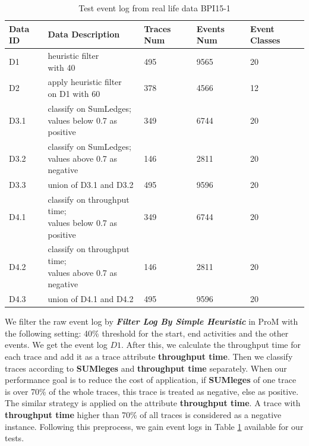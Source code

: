 \begin{table}[h]	
	\caption{Test event log from real life data BPI15-1}
	\label{tab:event-log}
	\begin{tabular}{|l|l|l|l|l|}
		\hline
		Data ID & Data Description                                & Traces Num & Events Num & Event Classes \\ \hline
		D1      & \makecell{heuristic filter  \\ with 40 }                     & 495        & 9565       & 20             \\ \hline
		D2      & \makecell{apply heuristic filter \\ on D1 with 60      }     & 378        & 4566       & 12            \\ \hline
		D3.1    & \makecell{classify on SumLedges;  \\ values below 0.7 as positive} & 349        & 6744       & 20             \\ \hline
		D3.2    & \makecell{classify on SumLedges;  \\ values above 0.7 as negative }& 146        & 2811       & 20             \\  \hline
		D3.3    & union of D3.1 and D3.2                             & 495        & 9596       & 20             \\ \hline
		D4.1    & \makecell{ classify on throughput time;  \\ values below 0.7 as positive} & 349        & 6744       & 20             \\ \hline
		D4.2    & \makecell{classify on throughput time;  \\ values above 0.7 as negative} & 146        & 2811       & 20            \\ \hline
		D4.3    & union of D4.1 and D4.2                             & 495        & 9596       & 20           \\ \hline
	\end{tabular}
\end{table}

We filter the raw event log by \textbf{\emph{Filter Log By Simple Heuristic}} in ProM with the following setting: 40\% threshold for the start, end  activities and the other events. We get the event log $D1$. After this, we calculate the throughput time for each trace and add it as a trace attribute \textbf{throughput time}. 
Then we classify traces according to  \textbf{SUMleges} and  \textbf{throughput time} separately. When our performance goal is to reduce the cost of application, if \textbf{SUMleges} of one trace is over 70\% of the whole traces, this trace is treated as negative, else as positive. The similar strategy is applied on the attribute \textbf{throughput time}. A trace with \textbf{throughput time} higher than 70\% of all traces is considered as a negative instance. Following this preprocess, we gain event logs in Table \ref{tab:event-log} available for our tests. 


